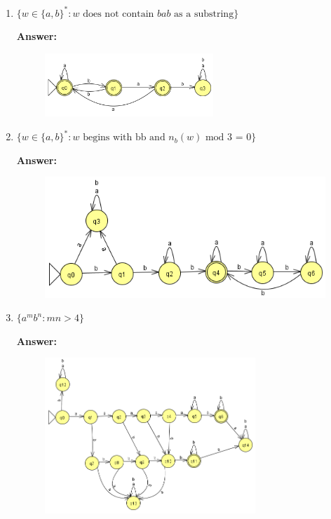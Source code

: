 \documentclass[12pt]{article}
\begin{document}
\begin{enumerate}
\begin{enumerate}
		            \newpage

		      \item $\{w \in \{a,b \}^* : \text{$w$ does not contain $bab$ as a substring} \}$

		            \noindent \textbf{Answer:}

		            \begin{figure}[h!]
			            \centering
			            \includegraphics[width=0.6\textwidth]{img/q3/q3_c.png}
		            \end{figure}

		      \item $\{w \in \{a,b \}^* : \text{$w$ begins with bb and $n_b(w)$ mod 3 = 0} \}$

		            \noindent \textbf{Answer:}

		            \begin{figure}[h!]
			            \centering
			            \includegraphics[width=0.75	\textwidth]{img/q3/q3_d.png}
		            \end{figure}

		            \newpage

		      \item $\{a^mb^n : mn > 4\}$

		            \noindent \textbf{Answer:}

		            \begin{figure}[h!]
			            \centering
			            \includegraphics[width=0.75\textwidth]{img/q3/q3_e.png}
		            \end{figure}


\end{enumerate}
\end{enumerate}
\end{document}
